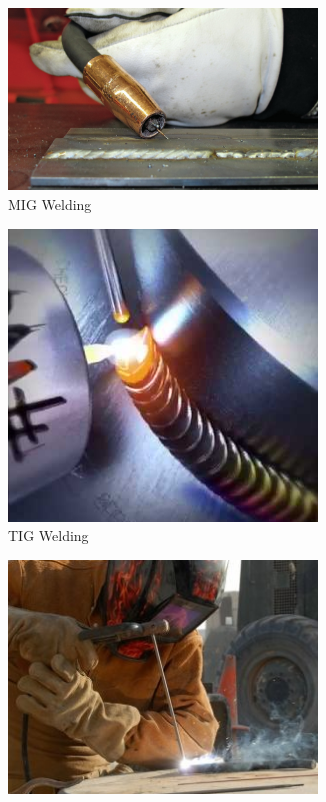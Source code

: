 \documentclass[10pt,letterpaper]{book}
\begin{document}
 	\begin{figure}[H]
		\centering
		\begin{subfigure}[b]{.24\linewidth}
			\includegraphics[width=0.9\textwidth]{imgs/mig.png}
			\caption{MIG Welding}
		\end{subfigure}\begin{subfigure}[b]{.24\linewidth}
			\includegraphics[width=0.9\textwidth]{imgs/tig.png}
			\caption{TIG Welding}
		\end{subfigure}\begin{subfigure}[b]{.24\linewidth}
			\includegraphics[width=0.9\textwidth]{imgs/arcweld.png}

\end{subfigure}
\end{figure}
\end{document}
